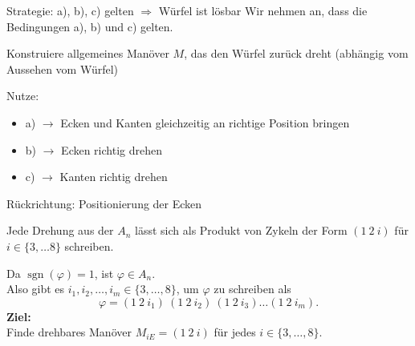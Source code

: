 \documentclass[11pt, aspectratio=169, xcolor={dvipsnames}]{beamer} %
\DeclareMathOperator{\sgn}{sgn}
\theoremstyle{plain}
\theoremstyle{definition}
\begin{document}
\begin{frame}{Strategie: a), b), c) gelten \(\Rightarrow\) Würfel ist lösbar}
Wir nehmen an, dass die Bedingungen a), b) und c) gelten. 

\vspace{7mm}

Konstruiere allgemeines Manöver \(M\), das den Würfel zurück dreht (abhängig vom Aussehen vom Würfel)

\vspace{7mm}

Nutze: 
\begin{itemize}
	\item[] a) \(\rightarrow\) Ecken und Kanten gleichzeitig an richtige Position bringen
	\item[] b) \(\rightarrow\) Ecken richtig drehen
	\item[] c) \(\rightarrow\) Kanten richtig drehen
\end{itemize}
\end{frame}

 \begin{frame}{Rückrichtung: Positionierung der Ecken}
      \begin{tcolorbox}[colback=ForestGreen!5!white,colframe=ForestGreen!75!black,title=Fakt]
	         Jede Drehung aus der \(A_n\) lässt sich als Produkt von Zykeln der Form \((1 \ 2 \ i)\) für \(i \in \{3, \ldots 8\}\) schreiben. 
	     \end{tcolorbox}
     \vspace{3mm}
     Da \(\sgn(\varphi) = 1\), ist \(\varphi \in A_{n}\). \\[4pt]
     Also gibt es \(i_1, i_2, \ldots, i_m \in \{3, \ldots, 8\}\), um \(\varphi\) zu schreiben als 
     \[
         \varphi = (1~2~i_1)~(1~2~i_2)~(1~2~i_3) \ldots (1~2~i_m).
     \]
     \textbf{Ziel:}\\
     Finde drehbares Manöver \(M_{iE} = (1~2~i)\) für jedes \(i \in \{3, \ldots, 8\}\). 
 \end{frame}
\end{document}
